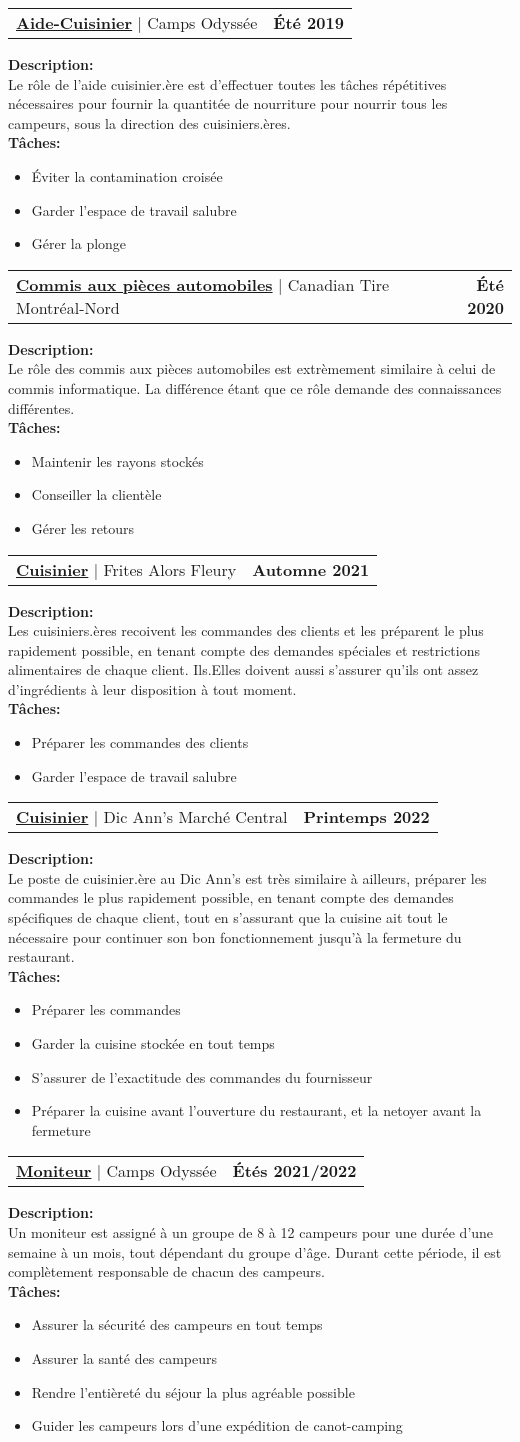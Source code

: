 \documentclass{article}
\makeatletter
\newcommand{\resumeItem}[1]{
  \item\small{
    {#1 \vspace{-2pt}}
  }
}
\newcommand{\formerJobHeading}[3]{
    \item
    \begin{tabular*}{1.001\textwidth}{l@{\extracolsep{\fill}}r}
      \textbf{\underline{\large#1}} $|$ \large#2 & \textbf{\small #3}\\
    \end{tabular*}\vspace{3pt}
    }
\newcommand{\jobDescription}[1]{\textbf{\large Description:}\\{\small#1}\\}
\newcommand{\taskListStart}{\textbf{\large Tâches:}\begin{itemize}}
\newcommand{\taskListEnd}{\end{itemize}\vspace{-18pt}}
\makeatother
\begin{document}
\formerJobHeading{Aide-Cuisinier}{Camps Odyssée}{Été 2019}
\jobDescription{Le rôle de l'aide cuisinier.ère est d'effectuer toutes les tâches répétitives
  nécessaires pour fournir la quantitée de nourriture pour nourrir tous les campeurs,
  sous la direction des cuisiniers.ères.}
\taskListStart
	\resumeItem{Éviter la contamination croisée}
	\resumeItem{Garder l'espace de travail salubre}
	\resumeItem{Gérer la plonge}
\taskListEnd

\formerJobHeading{Commis aux pièces automobiles}{Canadian Tire Montréal-Nord}{Été 2020}
\jobDescription{Le rôle des commis aux pièces automobiles est extrèmement similaire à celui de commis informatique.
  La différence étant que ce rôle demande des connaissances différentes.}
\taskListStart
	\resumeItem{Maintenir les rayons stockés}
	\resumeItem{Conseiller la clientèle}
	\resumeItem{Gérer les retours}
\taskListEnd

\formerJobHeading{Cuisinier}{Frites Alors Fleury}{Automne 2021}
\jobDescription{Les cuisiniers.ères recoivent les commandes des clients et les préparent le plus
  rapidement possible, en tenant compte des demandes spéciales et restrictions alimentaires
  de chaque client. Ils.Elles doivent aussi s'assurer qu'ils ont assez d'ingrédients à leur disposition
  à tout moment.}
\taskListStart
	\resumeItem{Préparer les commandes des clients}
	\resumeItem{Garder l'espace de travail salubre}
\taskListEnd

\formerJobHeading{Cuisinier}{Dic Ann's Marché Central}{Printemps 2022}
\jobDescription{Le poste de cuisinier.ère au Dic Ann's est très similaire à ailleurs, préparer les commandes
le plus rapidement possible, en tenant compte des demandes spécifiques de chaque client, tout en s'assurant
que la cuisine ait tout le nécessaire pour continuer son bon fonctionnement jusqu'à la fermeture du restaurant.}
\taskListStart
	\resumeItem{Préparer les commandes}
	\resumeItem{Garder la cuisine stockée en tout temps}
	\resumeItem{S'assurer de l'exactitude des commandes du fournisseur}
	\resumeItem{Préparer la cuisine avant l'ouverture du restaurant, et la netoyer avant la fermeture}
\taskListEnd

\formerJobHeading{Moniteur}{Camps Odyssée}{Étés 2021/2022}
\jobDescription{Un moniteur est assigné à un groupe de 8 à 12 campeurs pour une durée d'une semaine à un mois, tout dépendant du groupe d'âge.
Durant cette période, il est complètement responsable de chacun des campeurs.}
\taskListStart
	\resumeItem{Assurer la sécurité des campeurs en tout temps}
	\resumeItem{Assurer la santé des campeurs}
	\resumeItem{Rendre l'entièreté du séjour la plus agréable possible}
	\resumeItem{Guider les campeurs lors d'une expédition de canot-camping}
\taskListEnd
\end{document}
